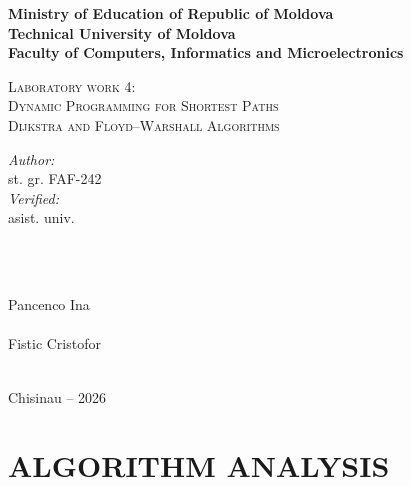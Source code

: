 \documentclass[12pt]{article}
\begin{document}
\begin{titlepage}
   \thispagestyle{empty}
   \begin{center}
    \textbf{\large Ministry of Education of Republic of Moldova}\\[0.1cm]
    \textbf{\large Technical University of Moldova}\\[0.1cm]
    \textbf{\large Faculty of Computers, Informatics and Microelectronics}\\[1.2cm]

    \vspace{45mm}

    \textsc{\Large Laboratory work 4:}\\[0.1cm]
    \textsc{\Large Dynamic Programming for Shortest Paths}\\[0.1cm]
    \textsc{\large Dijkstra and Floyd--Warshall Algorithms}\\[0.4cm]

    \vspace{70mm}

    \begin{minipage}[t]{0.4\textwidth}
    \begin{flushleft} \large
    \emph{Author:} \\
    st. gr. FAF-242 \\
    \emph{Verified:} \\
    asist. univ. \\
    \end{flushleft}
    \end{minipage}
    ~
    \begin{minipage}[t]{0.4\textwidth}
    \begin{flushright} \large
    \emph{} \\
    Pancenco Ina \\
    \emph{} \\
    Fistic Cristofor
    \end{flushright}
    \end{minipage}\\[3cm]

    \vspace{4mm}
    \large Chisinau -- 2026\\[0.5cm]

    \vfill
    \end{center}
\end{titlepage}

\clearpage
\thispagestyle{empty}
\tableofcontents

\clearpage
{}
\section{ALGORITHM ANALYSIS}
\end{document}
